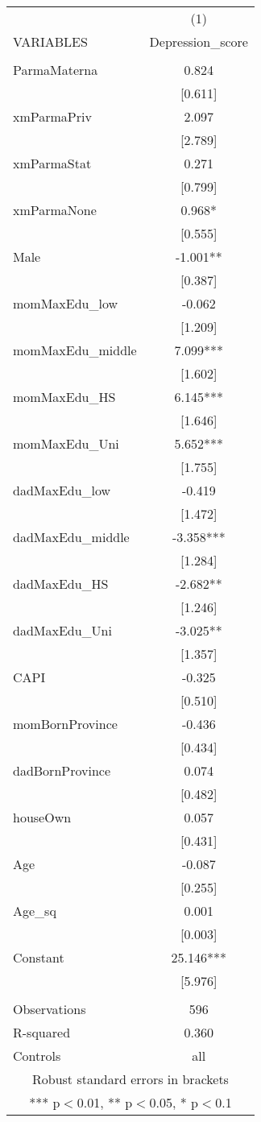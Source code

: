 \documentclass[]{article}
\begin{document}
\begin{tabular}{lc} \hline
 & (1) \\
VARIABLES & Depression\_score \\ \hline
 &  \\
ParmaMaterna & 0.824 \\
 & [0.611] \\
xmParmaPriv & 2.097 \\
 & [2.789] \\
xmParmaStat & 0.271 \\
 & [0.799] \\
xmParmaNone & 0.968* \\
 & [0.555] \\
Male & -1.001** \\
 & [0.387] \\
momMaxEdu\_low & -0.062 \\
 & [1.209] \\
momMaxEdu\_middle & 7.099*** \\
 & [1.602] \\
momMaxEdu\_HS & 6.145*** \\
 & [1.646] \\
momMaxEdu\_Uni & 5.652*** \\
 & [1.755] \\
dadMaxEdu\_low & -0.419 \\
 & [1.472] \\
dadMaxEdu\_middle & -3.358*** \\
 & [1.284] \\
dadMaxEdu\_HS & -2.682** \\
 & [1.246] \\
dadMaxEdu\_Uni & -3.025** \\
 & [1.357] \\
CAPI & -0.325 \\
 & [0.510] \\
momBornProvince & -0.436 \\
 & [0.434] \\
dadBornProvince & 0.074 \\
 & [0.482] \\
houseOwn & 0.057 \\
 & [0.431] \\
Age & -0.087 \\
 & [0.255] \\
Age\_sq & 0.001 \\
 & [0.003] \\
Constant & 25.146*** \\
 & [5.976] \\
 &  \\
Observations & 596 \\
R-squared & 0.360 \\
 Controls & all \\ \hline
\multicolumn{2}{c}{ Robust standard errors in brackets} \\
\multicolumn{2}{c}{ *** p$<$0.01, ** p$<$0.05, * p$<$0.1} \\
\end{tabular}
\end{document}
